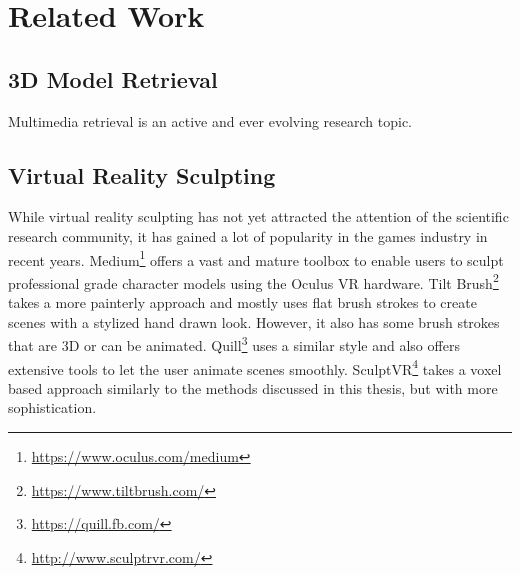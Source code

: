\chapter{Related Work}

\section{3D Model Retrieval}

Multimedia retrieval is an active and ever evolving research topic.

\section{Virtual Reality Sculpting}

While virtual reality sculpting has not yet attracted the attention of the scientific research community, it has gained a lot of popularity in the games industry in recent years.
Medium\footnote{\url{https://www.oculus.com/medium}} offers a vast and mature toolbox to enable users to sculpt professional grade character models using the Oculus VR hardware.
Tilt Brush\footnote{\url{https://www.tiltbrush.com/}} takes a more painterly approach and mostly uses flat brush strokes to create scenes with a stylized hand drawn look. However, it also has some brush strokes that are 3D or can be animated. Quill\footnote{\url{https://quill.fb.com/}} uses a similar style and also offers extensive tools to let the user animate scenes smoothly. SculptVR\footnote{\url{http://www.sculptrvr.com/}} takes a voxel based approach similarly to the methods discussed in this thesis, but with more sophistication.
